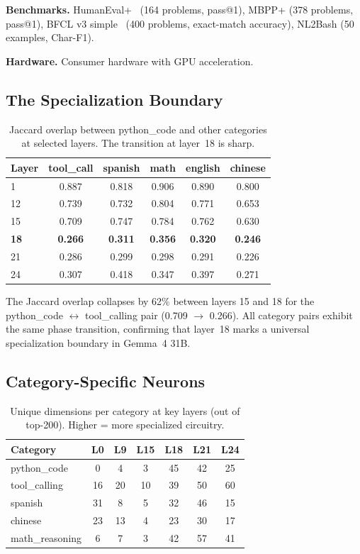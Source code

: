 \documentclass[11pt,a4paper]{article}
\begin{document}
\textbf{Benchmarks.} HumanEval+~\citep{liu2023evalplus} (164 problems, pass@1), MBPP+ (378 problems, pass@1), BFCL v3 simple~\citep{patil2023gorilla} (400 problems, exact-match accuracy), NL2Bash (50 examples, Char-F1).

\textbf{Hardware.} Consumer hardware with GPU acceleration.

\subsection{The Specialization Boundary}

\begin{table}[H]
\centering
\caption{Jaccard overlap between python\_code and other categories at selected layers. The transition at layer~18 is sharp.}
\label{tab:jaccard}
\begin{tabular}{lccccc}
\toprule
\textbf{Layer} & \textbf{tool\_call} & \textbf{spanish} & \textbf{math} & \textbf{english} & \textbf{chinese} \\
\midrule
1  & 0.887 & 0.818 & 0.906 & 0.890 & 0.800 \\
12 & 0.739 & 0.732 & 0.804 & 0.771 & 0.653 \\
15 & 0.709 & 0.747 & 0.784 & 0.762 & 0.630 \\
\textbf{18} & \textbf{0.266} & \textbf{0.311} & \textbf{0.356} & \textbf{0.320} & \textbf{0.246} \\
21 & 0.286 & 0.299 & 0.298 & 0.291 & 0.226 \\
24 & 0.307 & 0.418 & 0.347 & 0.397 & 0.271 \\
\bottomrule
\end{tabular}
\end{table}

The Jaccard overlap collapses by 62\% between layers 15 and 18 for the python\_code $\leftrightarrow$ tool\_calling pair (0.709 $\to$ 0.266). All category pairs exhibit the same phase transition, confirming that layer~18 marks a universal specialization boundary in Gemma~4 31B.

\subsection{Category-Specific Neurons}

\begin{table}[H]
\centering
\caption{Unique dimensions per category at key layers (out of top-200). Higher = more specialized circuitry.}
\label{tab:unique}
\begin{tabular}{lcccccc}
\toprule
\textbf{Category} & \textbf{L0} & \textbf{L9} & \textbf{L15} & \textbf{L18} & \textbf{L21} & \textbf{L24} \\
\midrule
python\_code    & 0  & 4  & 3  & 45 & 42 & 25 \\
tool\_calling   & 16 & 20 & 10 & 39 & 50 & 60 \\
spanish         & 31 & 8  & 5  & 32 & 46 & 15 \\
chinese         & 23 & 13 & 4  & 23 & 30 & 17 \\
math\_reasoning & 6  & 7  & 3  & 42 & 57 & 41 \\
\bottomrule
\end{tabular}
\end{table}
\end{document}
